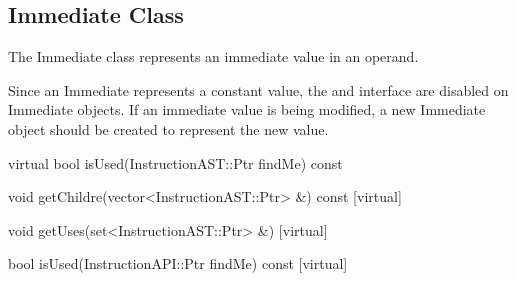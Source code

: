 \subsection{Immediate Class}
\label{sec:immediate}

The Immediate class represents an immediate value in an operand.

Since an Immediate represents a constant value, the  and
 interface are disabled on Immediate objects. If an immediate
value is being modified, a new Immediate object should be created to represent
the new value. 

\begin{apient}
virtual bool isUsed(InstructionAST::Ptr findMe) const
\end{apient}

\begin{apient}
void getChildre(vector<InstructionAST::Ptr> &) const [virtual]
\end{apient}

\begin{apient}
void getUses(set<InstructionAST::Ptr> &) [virtual]
\end{apient}

\begin{apient}
bool isUsed(InstructionAPI::Ptr findMe) const [virtual]
\end{apient}


